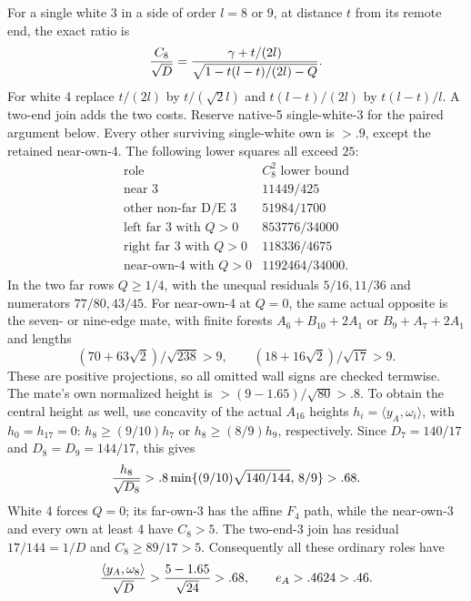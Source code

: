 \documentclass[11pt]{article}
\theoremstyle{definition}
\theoremstyle{remark}
\newcommand{\ip}[2]{\langle #1,#2\rangle}
\begin{document}
For a single white 3 in a side of order \(l=8\) or \(9\),
at distance \(t\) from its remote end, the exact ratio is
\[
 {C_8\over\sqrt D}
 ={\gamma+t/(2l)\over
       \sqrt{1-t(l-t)/(2l)-Q}}.
\]
For white 4 replace \(t/(2l)\) by \(t/(\sqrt2l)\) and
\(t(l-t)/(2l)\) by \(t(l-t)/l\).
A two-end join adds the two costs.
Reserve native-5 single-white-3 for the paired argument below.
Every other surviving single-white own is \(>.9\), except the
retained near-own-4.
The following lower squares all exceed \(25\):
\[
\begin{array}{c|c}
\text{role}& C_8^2\text{ lower bound}\\ \hline
\text{near 3}&11449/425\\
\text{other non-far D/E 3}&51984/1700\\
\text{left far 3 with }Q>0&853776/34000\\
\text{right far 3 with }Q>0&118336/4675\\
\text{near-own-4 with }Q>0&1192464/34000 .
\end{array}
\]
In the two far rows \(Q\ge1/4\), with the unequal residuals
\(5/16,11/36\) and numerators \(77/80,43/45\).
For near-own-4 at \(Q=0\), the same actual opposite is the
seven- or nine-edge mate, with finite forests
\(A_6+B_{10}+2A_1\) or \(B_9+A_7+2A_1\) and lengths
\[
 (70+63\sqrt2)/\sqrt{238}>9,\qquad
 (18+16\sqrt2)/\sqrt{17}>9.
\]
These are positive projections, so all omitted wall signs are
checked termwise.
The mate's own normalized height is
\(>(9-1.65)/\sqrt{80}>.8\).
To obtain the central height as well, use concavity of the actual
\(A_{16}\) heights \(h_i=\ip{y_A}{\omega_i}\), with \(h_0=h_{17}=0\):
\(h_8\ge(9/10)h_7\) or \(h_8\ge(8/9)h_9\), respectively.
Since \(D_7=140/17\) and \(D_8=D_9=144/17\), this gives
\[
 {h_8\over\sqrt{D_8}}>
 .8\min\{(9/10)\sqrt{140/144},\,8/9\}>.68 .
\]
White 4 forces \(Q=0\); its far-own-3 has the affine \(F_4\)
path, while the near-own-3 and every own at least 4 have \(C_8>5\).
The two-end-3 join has residual \(17/144=1/D\) and
\(C_8\ge89/17>5\).
Consequently all these ordinary roles have
\[
 {\ip{y_A}{\omega_8}\over\sqrt D}
 >{5-1.65\over\sqrt{24}}>.68,\qquad e_A>.4624>.46.
\]
\end{document}
